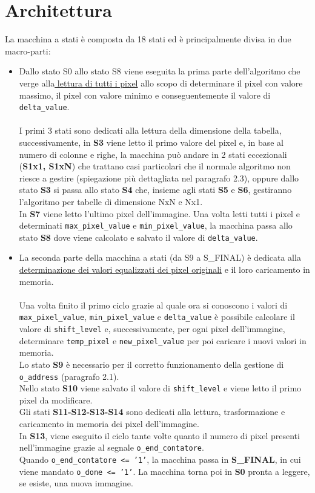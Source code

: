 \documentclass[12pt, table, xcdraw]{article}
\begin{document}
\section{Architettura}
La macchina a stati è composta da 18 stati ed è principalmente divisa in due macro-parti:
\begin{itemize}
\item Dallo stato S0 allo stato S8 viene eseguita la prima parte dell'algoritmo che verge alla\underline{ lettura di tutti i pixel} allo scopo di determinare il pixel con valore massimo, il pixel con valore minimo e conseguentemente il valore di \texttt{delta\_value}. \\ \\I primi 3 stati sono dedicati alla lettura della
dimensione della tabella, successivamente, in \textbf{S3} viene letto il primo valore del pixel e, in base al numero di colonne e righe, la macchina può andare in 2 stati eccezionali (\textbf{S1x1, S1xN}) che trattano casi particolari che il normale algoritmo non riesce a gestire (spiegazione più dettagliata nel paragrafo 2.3), oppure dallo stato \textbf{S3} si passa allo stato \textbf{S4} che, insieme agli stati \textbf{S5} e \textbf{S6}, gestiranno l'algoritmo per tabelle di dimensione 
NxN e Nx1.\\In \textbf{S7} viene letto l'ultimo pixel dell'immagine. Una volta letti tutti i pixel e determinati \texttt{max\_pixel\_value} e \texttt{min\_pixel\_value}, la macchina passa allo stato \textbf{S8} dove viene calcolato e salvato il valore di \texttt{delta\_value}.
\item La seconda parte della macchina a stati (da S9 a S\_FINAL) è dedicata alla \underline{determinazione dei valori equalizzati dei pixel originali} e il loro caricamento in memoria. \\ \\Una volta finito il primo ciclo grazie al quale ora si conoscono i valori di \texttt{max\_pixel\_value}, \texttt{min\_pixel\_value} e \texttt{delta\_value} è possibile calcolare il valore di \texttt{shift\_level} e, successivamente, per ogni pixel dell'immagine, determinare \texttt{temp\_pixel} e \texttt{new\_pixel\_value} per poi caricare i nuovi valori in memoria.\\ Lo stato \textbf{S9} è necessario per il corretto funzionamento della gestione di \texttt{o\_address} (paragrafo 2.1).\\ Nello stato \textbf{S10} viene salvato il valore di \texttt{shift\_level} e viene letto il primo pixel da modificare.\\ Gli stati \textbf{S11-S12-S13-S14} sono dedicati alla lettura, trasformazione e caricamento in memoria dei pixel dell'immagine. \\In \textbf{S13}, viene eseguito il ciclo tante volte quanto il numero di pixel presenti nell'immagine grazie al segnale \texttt{o\_end\_contatore}. \\Quando \texttt{o\_end\_contatore \textless= '1'}, la macchina passa in\textbf{ S\_FINAL}, in cui viene mandato \texttt{o\_done \textless= '1'}. La macchina torna poi in \textbf{S0} pronta a leggere, se esiste, una nuova immagine. 
\end{itemize}
\end{document}
